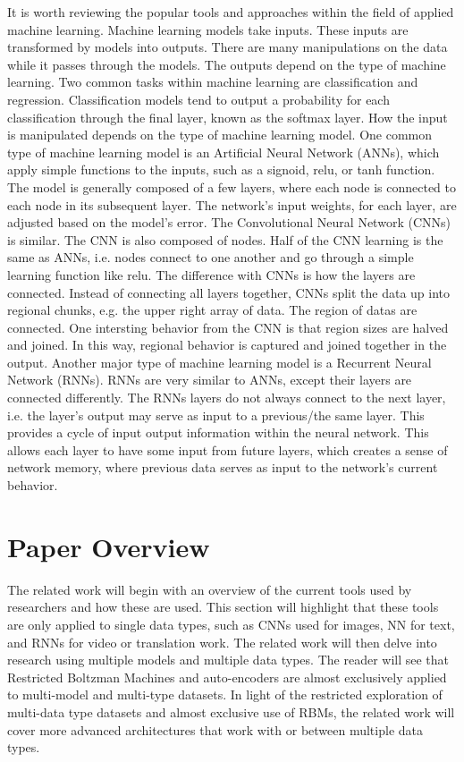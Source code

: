 It is worth reviewing the popular tools and approaches within the field of applied machine learning.  Machine learning models take inputs.  These inputs are transformed by models into outputs.  There are many manipulations on the data while it passes through the models.  The outputs depend on the type of machine learning.  Two common tasks within machine learning are classification and regression.  Classification models tend to output a probability for each classification through the final layer, known as the softmax layer.  How the input is manipulated depends on the type of machine learning model.  One common type of machine learning model is an Artificial Neural Network (ANNs), which apply simple functions to the inputs, such as a signoid, relu, or tanh function.  The model is generally composed of a few layers, where each node is connected to each node in its subsequent layer.  The network's input weights, for each layer, are adjusted based on the model's error.  The Convolutional Neural Network (CNNs) is similar.  The CNN is also composed of nodes.  Half of the CNN learning is the same as ANNs, i.e. nodes connect to one another and go through a simple learning function like relu.  The difference with CNNs is how the layers are connected.  Instead of connecting all layers together, CNNs split the data up into regional chunks, e.g. the upper right array of data.  The region of datas are connected.  One intersting behavior from the CNN is that region sizes are halved and joined.  In this way, regional behavior is captured and joined together in the output.  Another major type of machine learning model is a Recurrent Neural Network (RNNs).  RNNs are very similar to ANNs, except their layers are connected differently.  The RNNs layers do not always connect to the next layer, i.e. the layer's output may serve as input to a previous/the same layer.  This provides a cycle of input output information within the neural network.  This allows each layer to have some input from future layers, which creates a sense of network memory, where previous data serves as input to the network's current behavior.  

\chapter{Paper Overview}
The related work will begin with an overview of the current tools used by researchers and how these are used.  This section will highlight that these tools are only applied to single data types, such as CNNs used for images, NN for text, and RNNs for video or translation work.  The related work will then delve into research using multiple models and multiple data types.  The reader will see that Restricted Boltzman Machines and auto-encoders are almost exclusively applied to multi-model and multi-type datasets.  In light of the restricted exploration of multi-data type datasets and almost exclusive use of RBMs, the related work will cover more advanced architectures that work with or between multiple data types.

